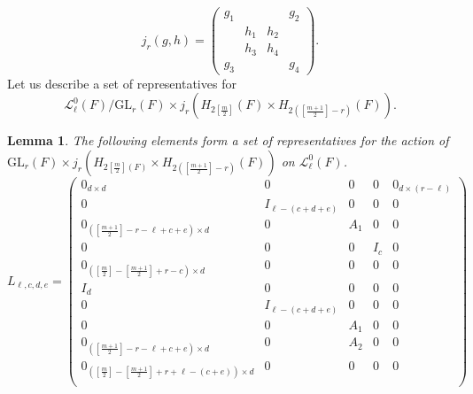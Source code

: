 \documentclass[12pts]{amsart}
\newcommand{\GL}{{\mathrm{GL}}}
\newcommand{\I}{{\mathrm{I}}}
\newtheorem{lem}[thm]{Lemma}
\begin{document}
\begin{equation}\label{9.61}
j_r(g,h)=\begin{pmatrix}g_1&&&g_2\\&h_1&h_2\\&h_3&h_4\\g_3&&&g_4\end{pmatrix}.
\end{equation} 
Let us describe a set of representatives for 
$$
\mathcal{L}^0_\ell(F)/\GL_r(F) \times j_r(H_{2[\frac{m}{2}]}(F)\times H_{2([\frac{m+1}{2}]-r)}(F)).
$$
\begin{lem}\label{lem 9.5}
	The following elements form a set of representatives for the action of $\GL_r(F) \times j_r(H_{2[\frac{m}{2}](F)}\times H_{2([\frac{m+1}{2}]-r)}(F))$ on $\mathcal{L}^0_\ell(F)$.
	\begin{equation}\label{9.62}
L_{\ell,c,d,e}=\begin{pmatrix}0_{d\times d}&0&0&0& 0_{d\times (r-\ell)}\\0&I_{\ell-(c+d+e)}&0&0&0\\0_{([\frac{m+1}{2}]-r-\ell+c+e)\times d}&0&A_1&0&0\\0&0&0&I_c&0\\0_{([\frac{m}{2}]-[\frac{m+1}{2}]+r-c)\times d}&0&0&0&0\\I_d&0&0&0&0\\0&I_{\ell-(c+d+e)}&0&0&0\\0&0&A_1&0&0\\0_{([\frac{m+1}{2}]-r-\ell+c+e)\times d}&0&A_2&0&0\\0_{([\frac{m}{2}]-[\frac{m+1}{2}]+r+\ell-(c+e))\times d}&0&0&0&0\\%


\end{pmatrix}
\end{equation}
\end{lem}
\end{document}

